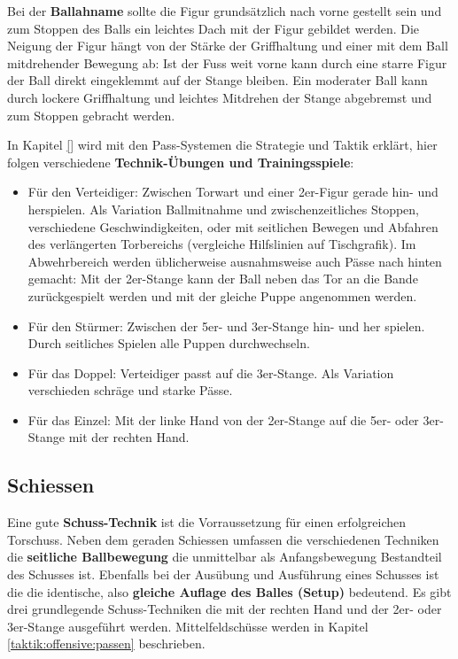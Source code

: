 Bei der \textbf{Ballahname} sollte die Figur grundsätzlich nach vorne gestellt sein und zum Stoppen des Balls ein leichtes Dach mit der Figur gebildet werden. 
Die Neigung der Figur hängt von der Stärke der Griffhaltung und einer mit dem Ball mitdrehender Bewegung ab: 
Ist der Fuss weit vorne kann durch eine starre Figur der Ball direkt eingeklemmt auf der Stange bleiben.
Ein moderater Ball kann durch lockere Griffhaltung und leichtes Mitdrehen der Stange abgebremst und zum Stoppen gebracht werden.

In Kapitel \ref{} wird mit den Pass-Systemen die Strategie und Taktik erklärt, hier folgen verschiedene \textbf{Technik-Übungen und Trainingsspiele}: 
\begin{itemize}
    \item Für den Verteidiger: Zwischen Torwart und einer 2er-Figur gerade hin- und herspielen. Als Variation Ballmitnahme und zwischenzeitliches Stoppen, verschiedene Geschwindigkeiten, oder mit seitlichen Bewegen und Abfahren des verlängerten Torbereichs (vergleiche Hilfslinien auf Tischgrafik).  
        Im Abwehrbereich werden üblicherweise ausnahmsweise auch Pässe nach hinten gemacht: Mit der 2er-Stange kann der Ball neben das Tor an die Bande zurückgespielt werden und mit der gleiche Puppe angenommen werden.
    \item Für den Stürmer: Zwischen der 5er- und 3er-Stange hin- und her spielen. Durch seitliches Spielen alle Puppen durchwechseln.
    \item Für das Doppel: Verteidiger passt auf die 3er-Stange. Als Variation verschieden schräge und starke Pässe.  
    \item Für das Einzel: Mit der linke Hand von der 2er-Stange auf die 5er- oder 3er-Stange mit der rechten Hand.
\end{itemize}



\subsection{Schiessen}
\label{technik:offensive:schiessen}

Eine gute \textbf{Schuss-Technik} ist die Vorraussetzung für einen erfolgreichen Torschuss.
Neben dem geraden Schiessen umfassen die verschiedenen Techniken die \textbf{seitliche Ballbewegung} die unmittelbar als Anfangsbewegung Bestandteil des Schusses ist.
Ebenfalls bei der Ausübung und Ausführung eines Schusses ist die die identische, also \textbf{gleiche Auflage des Balles (Setup)} bedeutend.
Es gibt drei grundlegende Schuss-Techniken die mit der rechten Hand und der 2er- oder 3er-Stange ausgeführt werden. 
Mittelfeldschüsse werden in Kapitel \ref{taktik:offensive:passen} beschrieben.

